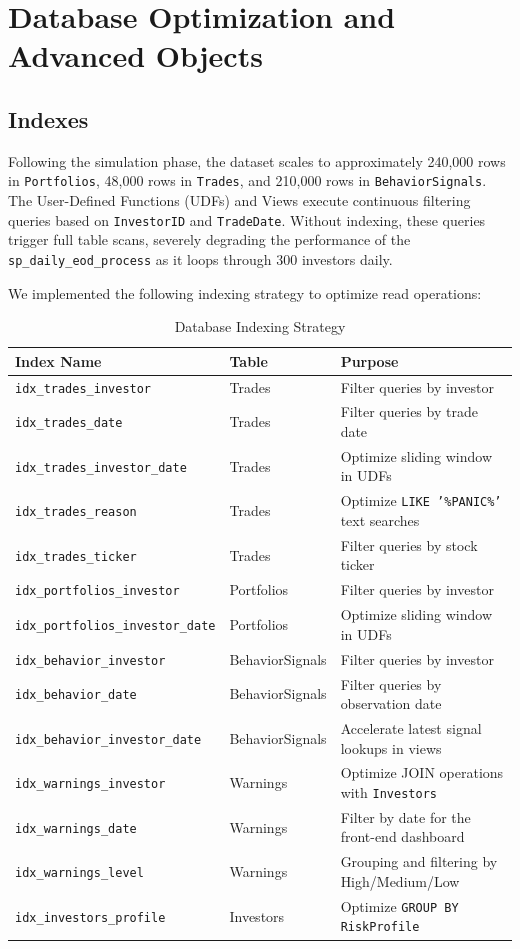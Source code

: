 
\section{Database Optimization and Advanced Objects}

\subsection{Indexes}
Following the simulation phase, the dataset scales to approximately 240,000 rows in \texttt{Portfolios}, 48,000 rows in \texttt{Trades}, and 210,000 rows in \texttt{BehaviorSignals}. The User-Defined Functions (UDFs) and Views execute continuous filtering queries based on \texttt{InvestorID} and \texttt{TradeDate}. Without indexing, these queries trigger full table scans, severely degrading the performance of the \texttt{sp\_daily\_eod\_process} as it loops through 300 investors daily. 

We implemented the following indexing strategy to optimize read operations:

\begin{table}[h!]
\centering
\begin{tabular}{|l|l|l|}
\hline
\textbf{Index Name} & \textbf{Table} & \textbf{Purpose} \\ \hline
\texttt{idx\_trades\_investor} & Trades & Filter queries by investor \\ \hline
\texttt{idx\_trades\_date} & Trades & Filter queries by trade date \\ \hline
\texttt{idx\_trades\_investor\_date} & Trades & Optimize sliding window in UDFs \\ \hline
\texttt{idx\_trades\_reason} & Trades & Optimize \texttt{LIKE '\%PANIC\%'} text searches \\ \hline
\texttt{idx\_trades\_ticker} & Trades & Filter queries by stock ticker \\ \hline
\texttt{idx\_portfolios\_investor} & Portfolios & Filter queries by investor \\ \hline
\texttt{idx\_portfolios\_investor\_date} & Portfolios & Optimize sliding window in UDFs \\ \hline
\texttt{idx\_behavior\_investor} & BehaviorSignals & Filter queries by investor \\ \hline
\texttt{idx\_behavior\_date} & BehaviorSignals & Filter queries by observation date \\ \hline
\texttt{idx\_behavior\_investor\_date} & BehaviorSignals & Accelerate latest signal lookups in views \\ \hline
\texttt{idx\_warnings\_investor} & Warnings & Optimize JOIN operations with \texttt{Investors} \\ \hline
\texttt{idx\_warnings\_date} & Warnings & Filter by date for the front-end dashboard \\ \hline
\texttt{idx\_warnings\_level} & Warnings & Grouping and filtering by High/Medium/Low \\ \hline
\texttt{idx\_investors\_profile} & Investors & Optimize \texttt{GROUP BY RiskProfile} \\ \hline
\end{tabular}
\caption{Database Indexing Strategy}
\end{table}

